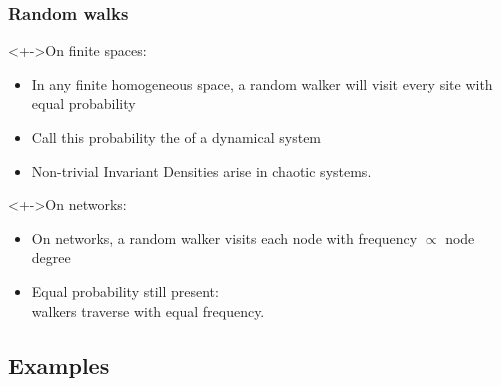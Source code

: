 \begin{frame}
  \frametitle{Random walks}
  
  \begin{block}<+->{On finite spaces:}
    \begin{itemize}
    \item<+-> In any finite homogeneous space, a random walker will visit every
      site with equal probability
    \item<+-> Call this probability the  of
      a dynamical system
    \item<+-> Non-trivial Invariant Densities arise in chaotic systems.
    \end{itemize}
  \end{block}

  \begin{block}<+->{On networks:}
    \begin{itemize}
    \item<+->
      On networks, a random walker visits each node
      with frequency $\propto$ node degree
      \hfill {}
    \item<+->
      Equal probability still present:\\
      walkers traverse
       with equal frequency. \\
      \mbox{} \hfill {}
    \end{itemize}
  \end{block}

\end{frame}




%   
%




\subsection{Examples}

